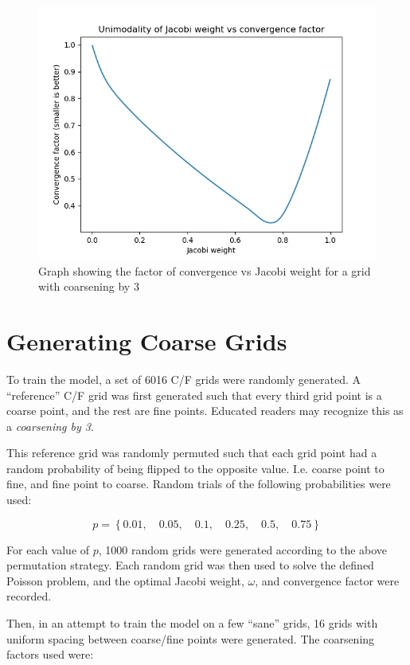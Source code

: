 \begin{figure}[h]
  \centering
  \includegraphics[scale=0.7]{figures/10-16-20-jacobi-conv-unimodality.png}
  \caption{Graph showing the factor of convergence vs Jacobi weight for a grid with coarsening by 3}
  \label{fig:jacobi_unimodal}
\end{figure}

\section{Generating Coarse Grids}

To train the model, a set of 6016 C/F grids were randomly generated.  A ``reference'' C/F grid was first generated such that every third grid point is a coarse point, and the rest are fine points.  Educated readers may recognize this as a \textit{coarsening by 3}.

This reference grid was randomly permuted such that each grid point had a random probability of being flipped to the opposite value.  I.e. coarse point to fine, and fine point to coarse.  Random trials of the following probabilities were used:

$$ p = \left\{0.01, \quad 0.05, \quad 0.1, \quad 0.25, \quad 0.5, \quad 0.75\right\} $$

For each value of $p$, 1000 random grids were generated according to the above permutation strategy.  Each random grid was then used to solve the defined Poisson problem, and the optimal Jacobi weight, $\omega$, and convergence factor were recorded.

Then, in an attempt to train the model on a few ``sane'' grids, 16 grids with uniform spacing between coarse/fine points were generated.  The coarsening factors used were:

